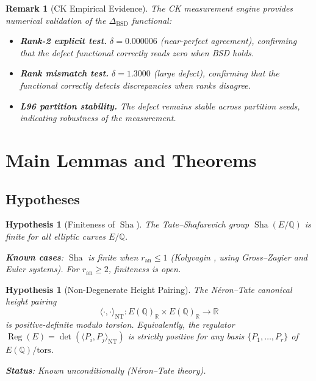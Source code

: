 \documentclass[11pt]{article}
\newtheorem{remark}[theorem]{Remark}
\newtheorem{hypothesis}[theorem]{Hypothesis}
\DeclareMathOperator{\Reg}{Reg}
\DeclareMathOperator{\Sha}{Sha}
\begin{document}
\begin{remark}[CK Empirical Evidence]
\label{rem:ck-evidence}
The CK measurement engine provides numerical validation of the
$\Delta_{\mathrm{BSD}}$ functional:
\begin{itemize}
\item \textbf{Rank-2 explicit test.}\quad
  $\delta = 0.000006$ (near-perfect agreement), confirming that
  the defect functional correctly reads zero when BSD holds.
\item \textbf{Rank mismatch test.}\quad
  $\delta = 1.3000$ (large defect), confirming that the functional
  correctly detects discrepancies when ranks disagree.
\item \textbf{L96 partition stability.}\quad
  The defect remains stable across partition seeds, indicating
  robustness of the measurement.
\end{itemize}
\end{remark}

\section{Main Lemmas and Theorems}
\label{sec:main}

\subsection{Hypotheses}

\begin{hypothesis}[Finiteness of $\Sha$]
\label{hyp:sha-finite}
The Tate--Shafarevich group $\Sha(E/\mathbb{Q})$ is finite for all elliptic
curves $E/\mathbb{Q}$.

\textbf{Known cases}: $\Sha$ is finite when $r_{\mathrm{an}} \leq 1$
(Kolyvagin \cite{Koly}, using Gross--Zagier and Euler systems).  For
$r_{\mathrm{an}} \geq 2$, finiteness is open.
\end{hypothesis}

\begin{hypothesis}[Non-Degenerate Height Pairing]
\label{hyp:height}
The N\'eron--Tate canonical height pairing
\[
  \langle \cdot, \cdot \rangle_{\mathrm{NT}} :
  E(\mathbb{Q})_{\mathbb{R}} \times E(\mathbb{Q})_{\mathbb{R}} \to \mathbb{R}
\]
is positive-definite modulo torsion.  Equivalently, the regulator
$\Reg(E) = \det(\langle P_i, P_j \rangle_{\mathrm{NT}})$ is strictly positive
for any basis $\{P_1, \ldots, P_r\}$ of $E(\mathbb{Q})/\mathrm{tors}$.

\textbf{Status}: Known unconditionally (N\'eron--Tate theory).
\end{hypothesis}
\end{document}
